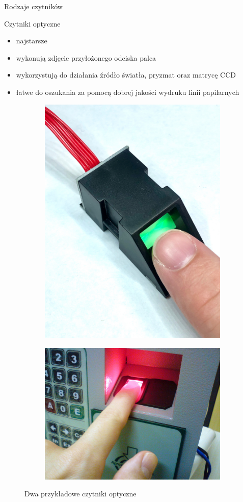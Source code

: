 \documentclass{beamer}
\begin{document}
\begin{frame}
    \centering
    \huge
    Rodzaje czytników
\end{frame}

\begin{frame}{Czytniki optyczne}
    \begin{itemize}
        \item najstarsze
        \item wykonują zdjęcie przyłożonego odciska palca
        \item wykorzystują do działania źródło światła, pryzmat oraz matrycę CCD
        \item łatwe do oszukania za pomocą dobrej jakości wydruku linii papilarnych
    \end{itemize}
    \smallskip
    \begin{figure}
        \centering
        \begin{subfigure}{.49\textwidth}
            \centering
            \includegraphics[width=0.3\linewidth]{types/fingerprint_as608_finger.jpg}
        \end{subfigure}
        \begin{subfigure}{.49\textwidth}
            \centering
            \includegraphics[width=0.5\linewidth]{types/Fingerprint_scanner_identification.jpg}
        \end{subfigure}
        \caption{Dwa przykładowe czytniki optyczne}
    \end{figure}
\end{frame}
\end{document}
